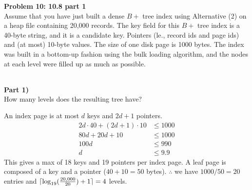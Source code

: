 \documentclass[12pt,letter]{article}
\DeclarePairedDelimiter{\ceil}{\lceil}{\rceil}
\newcommand{\problem}[1]{\vspace{3mm}\Large\textbf{{Problem
{#1}\vspace{3mm}}}\normalsize\\}
\newcommand{\ppart}[1]{\vspace{2mm}\large\textbf{\\Part
{#1})\vspace{2mm}}\normalsize\\}
\begin{document}
\begin{figure}[ht]
    \center
\end{figure}

\FloatBarrier
\problem{10: 10.8 part 1}
Assume that you have just built a dense $B+$ tree index using Alternative (2) on
a heap file containing 20,000 records. The key field for this $B+$ tree index is
a 40-byte string, and it is a candidate key. Pointers (le., record ids and page
ids) and (at most) 10-byte values. The size of one disk page is 1000 bytes. The
index was built in a bottom-up fashion using the bulk loading algorithm, and the
nodes at each level were filled up as much as possible.

\ppart{1}
How many levels does the resulting tree have?

An index page is at most $d$ keys and $2d+1$ pointers. 
\begin{align*}
    2d\cdot 40 + (2d+1)\cdot 10 &\leq 1000\\
    80d + 20d + 10 &\leq 1000 \\
    100d &\leq 990 \\
    d &\leq 9.9
\end{align*}
This gives a max of 18 keys and 19 pointers per index page. A leaf page is
composed of a key and a pointer ($40 + 10 = 50$ bytes). $\therefore$ we have
$1000/50 = 20$ entries and $\ceil{\log_{19}(\frac{20,000}{20}) + 1} = 4$ levels.
\end{document}
